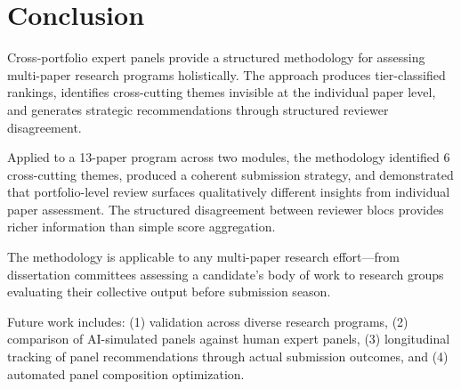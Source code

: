 \section{Conclusion}

Cross-portfolio expert panels provide a structured methodology for assessing multi-paper research programs holistically. The approach produces tier-classified rankings, identifies cross-cutting themes invisible at the individual paper level, and generates strategic recommendations through structured reviewer disagreement.

Applied to a 13-paper program across two modules, the methodology identified 6 cross-cutting themes, produced a coherent submission strategy, and demonstrated that portfolio-level review surfaces qualitatively different insights from individual paper assessment. The structured disagreement between reviewer blocs provides richer information than simple score aggregation.

The methodology is applicable to any multi-paper research effort---from dissertation committees assessing a candidate's body of work to research groups evaluating their collective output before submission season.

Future work includes: (1) validation across diverse research programs, (2) comparison of AI-simulated panels against human expert panels, (3) longitudinal tracking of panel recommendations through actual submission outcomes, and (4) automated panel composition optimization.
